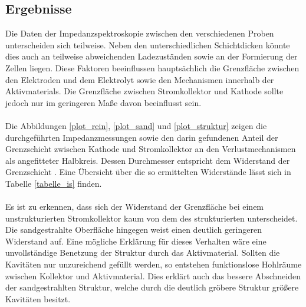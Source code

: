 \documentclass[a4paper, 11pt, headsepline,footsepline,twoside,abstract]{scrbook}
\begin{document}
\subsection{Ergebnisse}
Die Daten der Impedanzspektroskopie zwischen den verschiedenen Proben unterscheiden sich teilweise. Neben den unterschiedlichen Schichtdicken könnte dies auch an teilweise abweichenden Ladezuständen sowie an der Formierung der Zellen liegen. Diese Faktoren beeinflussen hauptsächlich die Grenzfläche zwischen den Elektroden und dem Elektrolyt sowie den Mechanismen innerhalb der Aktivmaterials. Die Grenzfläche zwischen Stromkollektor und Kathode sollte jedoch nur im geringeren Maße davon beeinflusst sein.
\\\\
Die Abbildungen \ref{plot_rein}, \ref{plot_sand} und \ref{plot_struktur} zeigen die durchgeführten Impedanzmessungen sowie den darin gefundenen Anteil der Grenzschicht zwischen Kathode und Stromkollektor an den Verlustmechanismen als angefitteter Halbkreis. Dessen Durchmesser entspricht dem Widerstand der Grenzschicht \cite{bub_skript}. Eine Übersicht über die so ermittelten Widerstände lässt sich in Tabelle \ref{tabelle_is} finden.
\\\\
Es ist zu erkennen, dass sich der Widerstand der Grenzfläche bei einem unstrukturierten Stromkollektor kaum von dem des strukturierten unterscheidet. Die sandgestrahlte Oberfläche hingegen weist einen deutlich geringeren Widerstand auf. Eine mögliche Erklärung für dieses Verhalten wäre eine unvollständige Benetzung der Struktur durch das Aktivmaterial. Sollten die Kavitäten nur unzureichend gefüllt werden, so entstehen funktionslose Hohlräume zwischen Kollektor und Aktivmaterial. Dies erklärt auch das bessere Abschneiden der sandgestrahlten Struktur, welche durch die deutlich gröbere Struktur größere Kavitäten besitzt.
\end{document}
